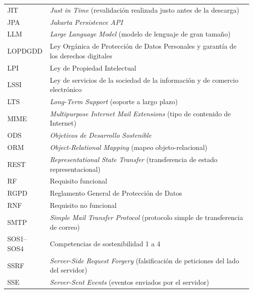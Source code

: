 \begin{longtable}{p{}p{}}
JIT &
\emph{Just in Time} (revalidación realizada justo antes de la descarga)\\

JPA &
\emph{Jakarta Persistence API}\\

LLM &
\emph{Large Language Model} (modelo de lenguaje de gran tamaño)\\

LOPDGDD &
Ley Orgánica de Protección de Datos Personales y garantía de los derechos digitales\\

LPI &
Ley de Propiedad Intelectual\\

LSSI &
Ley de servicios de la sociedad de la información y de comercio electrónico\\

LTS &
\emph{Long-Term Support} (soporte a largo plazo)\\

MIME &
\emph{Multipurpose Internet Mail Extensions} (tipo de contenido de Internet)\\

ODS &
\emph{Objetivos de Desarrollo Sostenible}\\

ORM &
\emph{Object-Relational Mapping} (mapeo objeto-relacional)\\

REST &
\emph{Representational State Transfer} (transferencia de estado representacional)\\

RF &
Requisito funcional\\

RGPD &
Reglamento General de Protección de Datos\\

RNF &
Requisito no funcional\\

SMTP &
\emph{Simple Mail Transfer Protocol} (protocolo simple de transferencia de correo)\\

{\footnotesize SOS1--SOS4} &
Competencias de sostenibilidad 1 a 4\\

SSRF &
\emph{Server-Side Request Forgery} (falsificación de peticiones del lado del servidor)\\

SSE &
\emph{Server-Sent Events} (eventos enviados por el servidor)\\


\end{longtable}
